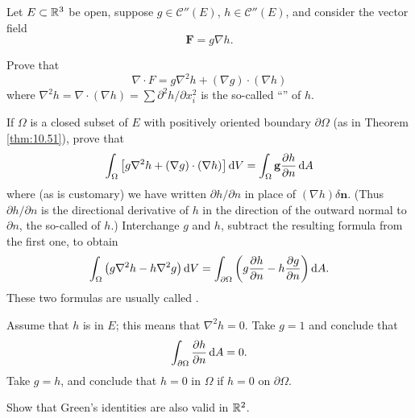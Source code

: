 \begin{myexercise}
    \label{ex:10.31}
    Let $E \subset {\protect\mathbb R}^3$ be open,
    suppose $g \in  \mathscr{C}''(E)$, $h \in \mathscr{C}''(E)$, and consider the vector field
    \begin{equation*}
        \mathbf{F} = g \nabla h .
    \end{equation*}
    \begin{asparaenum}[(a)]
        \item Prove that
        \begin{equation*}
            \nabla \cdot F = g \nabla^2 h + (\nabla g) \cdot (\nabla h)
        \end{equation*}
        where $\nabla^2 h = \nabla \cdot (\nabla h) = \sum \partial^2 h/ \partial x_i^2$ is the so-called ``'' of $h$.
        \item If $\Omega$ is a closed subset of $E$ with positively oriented boundary $\partial\Omega$ (as in Theorem \ref{thm:10.51}), prove that
        \begin{equation*}
            \int_{\Omega} \left[
                g \nabla^2 h +
                (\nabla g) \cdot (\nabla h)
                \right] \d V =
            \int_{\Omega} \mathbf{g} \frac{\partial h}{\partial n} \d A
        \end{equation*}
        where (as is customary) we have written $\partial h/\partial n$ in place of $(\nabla h) \delta \mathbf{n}$.
        (Thus $\partial h/\partial n$ is the directional derivative of $h$ in the direction of the outward normal to $\partial n$,
        the so-called  of $h$.)
        Interchange $g$ and $h$, subtract the resulting formula from the first one, to obtain
        \begin{equation*}
            \int_{\Omega} \left(
            g \nabla^2 h -
            h \nabla^2 g
            \right) \d V =
            \int_{\partial \Omega} \left(
            g \frac{\partial h}{\partial n} -
            h \frac{\partial g}{\partial n}
            \right) \d A .
        \end{equation*}
        These two formulas are usually called .
        \item Assume that $h$ is  in $E$; this means that $\nabla^2 h = 0$.
        Take $g = 1$ and conclude that
        \begin{equation*}
            \int_{\partial\Omega} \frac{\partial h}{\partial n} \d A = 0.
        \end{equation*}
        Take $g = h$, and conclude that $h = 0$ in $\Omega$ if $h = 0$ on $\partial\Omega$.
        \item Show that Green's identities are also valid in ${\protect\mathbb R}^2$.
    \end{asparaenum}
\end{myexercise}


